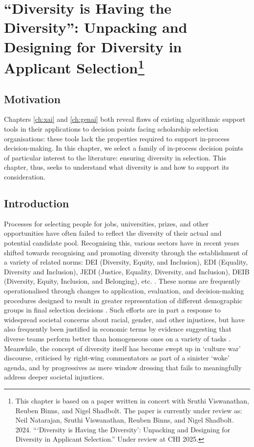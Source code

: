 \chapter[``Diversity is Having the Diversity'']{\label{ch:diversity}``Diversity is Having the Diversity'': Unpacking and Designing for Diversity in Applicant Selection\footnote{This chapter is based on a paper written in concert with Sruthi Viswanathan, Reuben Binns, and Nigel Shadbolt. The paper is currently under review as: Neil Natarajan, Sruthi Viswanathan, Reuben Binns, and Nigel Shadbolt. 2024. “‘Diversity is Having the Diversity’: Unpacking and Designing for Diversity in Applicant Selection.” Under review at CHI 2025.}}

\minitoc

\section{Motivation}
Chapters \ref{ch:xai} and \ref{ch:genai} both reveal flaws of existing algorithmic support tools in their applications to decision points facing scholarship selection organisations: these tools lack the properties required to support in-process decision-making. In this chapter, we select a family of in-process decision points of particular interest to the literature: ensuring diversity in selection. This chapter, thus, seeks to understand what diversity is and how to support its consideration.
  
\section{Introduction}\label{sec:divintro}
Processes for selecting people for jobs, universities, prizes, and other opportunities have often failed to reflect the diversity of their actual and potential candidate pool. Recognising this, various sectors have in recent years shifted towards recognising and promoting diversity through the establishment of a variety of related norms: DEI (Diversity, Equity, and Inclusion), EDI (Equality, Diversity and Inclusion), JEDI (Justice, Equality, Diversity, and Inclusion), DEIB (Diversity, Equity, Inclusion, and Belonging), etc. \cite{pinkett2023data,hsieh2019allocation,minkin2023diversity}. These norms are frequently operationalised through changes to application, evaluation, and decision-making procedures designed to result in greater representation of different demographic groups in final selection decisions \cite{pinkett2023data}. Such efforts are in part a response to widespread societal concerns about racial, gender, and other injustices, but have also frequently been justified in economic terms by evidence suggesting that diverse teams perform better than homogeneous ones on a variety of tasks \cite{deming2017growing,page_diversity_2017,noray2023systemic}. Meanwhile, the concept of diversity itself has become swept up in `culture war' discourse, criticised by right-wing commentators as part of a sinister `woke' agenda, and by progressives as mere window dressing that fails to meaningfully address deeper societal injustices. 

